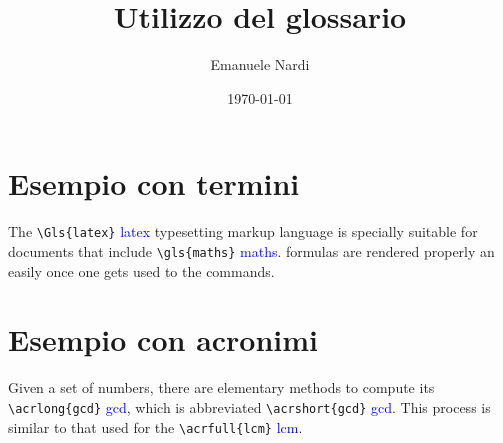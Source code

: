\documentclass{article}
\title{Utilizzo del glossario}
\author{Emanuele Nardi}
\date{\today}
\begin{document}
\maketitle

\renewcommand{\contentsname}{Indice dei contenuti}
\tableofcontents

\section{Esempio con termini}

The \verb|\Gls{latex}| \textcolor{blue}{\Gls{latex}} typesetting markup language is specially suitable for documents that include \verb|\gls{maths}| \textcolor{blue}{\gls{maths}}. \Glspl{formula} are rendered properly an easily once one gets used to the commands.

\section{Esempio con acronimi}

Given a set of numbers, there are elementary methods to compute its \verb|\acrlong{gcd}| \textcolor{blue}{\acrlong{gcd}}, which is abbreviated \verb|\acrshort{gcd}| \textcolor{blue}{\acrshort{gcd}}.
This process is similar to that used for the \verb|\acrfull{lcm}| \textcolor{blue}{\acrfull{lcm}}.

\vfill

\printglossary[title=Lista dei termini, toctitle=Glossario]

\printglossary[type=\acronymtype, title=Lista degli acronimi, toctitle=Acronimi]
\end{document}
